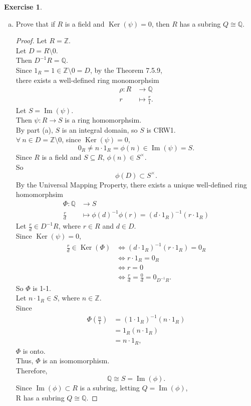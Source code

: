\documentclass{article}
\newcommand{\bbz}{\mathbb{Z}}
\newcommand{\bbq}{\mathbb{Q}}
\renewcommand{\ker}{\operatorname{Ker}}
\newcommand{\im}{\operatorname{Im}}
\theoremstyle{plain}
\theoremstyle{definition}
\newtheorem{exer}[lem]{Exercise}
\begin{document}
\begin{exer}
\begin{enumerate}[(a)]
\item Prove that if $R$ is a field and $\ker(\psi)=0$, then $R$ has a subring $Q\cong\bbq$.
    \begin{proof}
    Let $R = \bbz$.\\
    Let $D = R \setminus 0$.\\
    Then $D^{-1}R = \bbq$.\\
    Since $1_R = 1 \in \bbz \setminus 0 =D$, by the Theorem 7.5.9,\\
    there exists a well-defined ring monomorphsim 
    \begin{align*}
        \rho:R &\to \bbq \\
             r &\mapsto \frac{r}{1}.
    \end{align*}
    Let $S = \im(\psi)$.\\
    Then $\psi:R\to S$ is a ring homomorphsim.\\
    By part (a), $S$ is an integral domain, so $S$ is CRW1.\\
    $\forall \ n\in D = \bbz \setminus 0$, since $\ker(\psi) = 0$,
    \[ 0_R \neq n \cdot 1_R = \phi(n) \in \im(\psi) = S.\]
    Since $R$ is a field and $S \subseteq R$, $\phi(n) \in S^{\times}$.\\ 
    So 
    \[\phi(D) \subset S^{\times}.\]
    By the Universal Mapping Property, there exists a unique well-defined ring homomorphsim 
    \begin{align*}
    \Phi: \bbq &\to S\\
    \frac{r}{d} &\mapsto {\phi(d)}^{-1}\phi(r) = (d\cdot 1_R)^{-1}(r \cdot 1_R)
    \end{align*}
   Let $\frac{r}{d} \in D^{-1}R$, where $r \in R$ and $d\in D$. \\
   Since $\ker(\psi) = 0$,
   \begin{align*}
       \frac{r}{d} \in \ker(\Phi)&\Longleftrightarrow (d\cdot 1_R)^{-1}(r\cdot 1_R) = 0_R \\
       &\Longleftrightarrow r\cdot 1_R = 0_R \\
       &\Longleftrightarrow r = 0\\
       &\Longleftrightarrow \frac{r}{d} = \frac{0}{d} = 0_{D^{-1}R}.
   \end{align*}
   So $\Phi$ is 1-1.\\
   Let $n\cdot 1_R \in S$, where $n \in \bbz$.\\
   Since 
   \begin{align*}
       \Phi\left(\frac{n}{1}\right) &= (1\cdot 1_R)^{-1}(n\cdot 1_R)\\
       &= 1_R (n\cdot 1_R)\\
       &=n\cdot 1_R, 
   \end{align*}
   $\Phi$ is onto.\\
   Thus, $\Phi$ is an isomomorphism.\\
   Therefore, \[ \bbq \cong S = \im(\phi).\]
   Since $\im(\phi) \subset R$ is a subring, letting $Q = \im(\phi)$,\\
   R has a subring $Q \cong \bbq$.


\end{proof}
\end{enumerate}
\end{exer}
\end{document}

